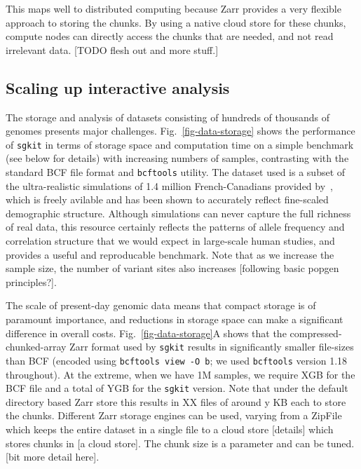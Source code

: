 \documentclass[a4paper,num-refs]{oup-contemporary}
\newcommand{\toolname}[1]{\texttt{#1}}
\begin{document}
This maps well to distributed computing because Zarr provides a
very flexible approach to storing the chunks. By using a native cloud store
for these chunks, compute nodes can directly access the chunks that
are needed, and not read irrelevant data.
[TODO flesh out and more stuff.]

\subsection{Scaling up interactive analysis}
The storage and analysis of datasets consisting of hundreds of
thousands of genomes presents major challenges.
Fig.~\ref{fig-data-storage} shows the performance of \toolname{sgkit}
in terms of storage space and computation time  on a simple benchmark (see
below for details) with increasing
numbers of samples, contrasting with the standard BCF file format
and \toolname{bcftools} utility.
The dataset used is a subset of the
ultra-realistic simulations of 1.4 million French-Canadians
provided by~\citet{anderson2023genes}, which is freely avilable
and has been shown to
accurately reflect fine-scaled demographic structure.
Although
simulations can never capture the full richness of real data,
this resource certainly reflects the patterns of allele frequency
and correlation structure that we would expect in large-scale
human studies, and provides a useful and reproducable benchmark.
Note that as we increase the sample size, the number of variant
sites also increases [following basic popgen principles?].

The scale of present-day genomic data means that compact
storage is of paramount importance, and reductions in storage space
can make a significant difference in overall costs.
Fig.~\ref{fig-data-storage}A shows that the
compressed-chunked-array Zarr format used by \toolname{sgkit} results
in significantly smaller file-sizes than BCF (encoded using
\texttt{bcftools view -O b}; we used \toolname{bcftools}
version 1.18 throughout). At the extreme, when we have 1M
samples, we require XGB for the BCF file and a total of YGB
for the \toolname{sgkit} version. Note that under the default
directory based Zarr store this results in XX files of around
y KB each to store the chunks. Different Zarr storage engines
can be used, varying from a ZipFile which keeps the entire
dataset in a single file to a cloud store [details] which stores
chunks in [a cloud store]. The chunk size is a parameter and
can be tuned. [bit more detail here].
\end{document}
